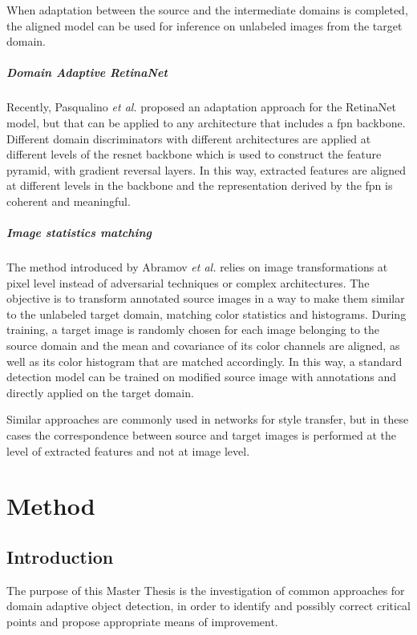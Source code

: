 \documentclass[%
    corpo=12pt,
    twoside,
    stile=classica,   
    tipotesi=magistrale,
    evenboxes,
    english,
	numerazioneromana,
]{toptesi}
\begin{document}
When adaptation between the source and the intermediate domains is completed, the aligned model can be used for inference on unlabeled images from the target domain.

\paragraph{Domain Adaptive RetinaNet}\label{sec:daretinanet}
Recently, Pasqualino \emph{et al.}\cite{pasqualino2020unsupervised} proposed an adaptation approach for the RetinaNet model, but that can be applied to any architecture that includes a \gls{fpn} backbone. Different domain discriminators with different architectures are applied at different levels of the \gls{resnet} backbone which is used to construct the feature pyramid, with gradient reversal layers. In this way, extracted features are aligned at different levels in the backbone and the representation derived by the \gls{fpn} is coherent and meaningful.

\paragraph{Image statistics matching}\label{sec:kis}
The method introduced by Abramov \emph{et al.}\cite{abramov2020simple} relies on image transformations at pixel level instead of adversarial techniques or complex architectures. The objective is to transform annotated source images in a way to make them similar to the unlabeled target domain, matching color statistics and histograms. During training, a target image is randomly chosen for each image belonging to the source domain and the mean and covariance of its color channels are aligned, as well as its color histogram that are matched accordingly. In this way, a standard detection model can be trained on modified source image with annotations and directly applied on the target domain.

Similar approaches are commonly used in networks for style transfer, but in these cases the correspondence between source and target images is performed at the level of extracted features and not at image level.



\chapter{Method}
\section{Introduction}
The purpose of this Master Thesis is the investigation of common approaches for domain adaptive object detection, in order to identify and possibly correct critical points and propose appropriate means of improvement.
\end{document}
